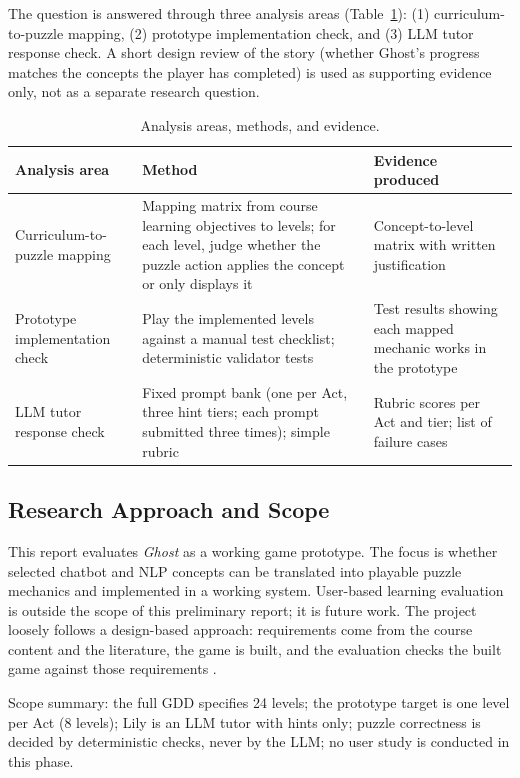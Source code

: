 \documentclass[11pt,a4paper]{article}
\begin{document}
The question is answered through three analysis areas (Table~\ref{tab:evals}): (1) curriculum-to-puzzle mapping, (2) prototype implementation check, and (3) LLM tutor response check. A short design review of the story (whether Ghost's progress matches the concepts the player has completed) is used as supporting evidence only, not as a separate research question.

\begin{table}[h]
\centering
\small
\begin{tabular}{p{4.2cm}p{5.5cm}p{4.3cm}}
\toprule
\textbf{Analysis area} & \textbf{Method} & \textbf{Evidence produced} \\
\midrule
Curriculum-to-puzzle mapping
  & Mapping matrix from course learning objectives to levels; for each level, judge whether the puzzle action applies the concept or only displays it
  & Concept-to-level matrix with written justification \\
\addlinespace
Prototype implementation check
  & Play the implemented levels against a manual test checklist; deterministic validator tests
  & Test results showing each mapped mechanic works in the prototype \\
\addlinespace
LLM tutor response check
  & Fixed prompt bank (one per Act, three hint tiers; each prompt submitted three times); simple rubric
  & Rubric scores per Act and tier; list of failure cases \\
\bottomrule
\end{tabular}
\caption{Analysis areas, methods, and evidence.}
\label{tab:evals}
\end{table}

\subsection{Research Approach and Scope}

This report evaluates \textit{Ghost} as a working game prototype. The focus is whether selected chatbot and NLP concepts can be translated into playable puzzle mechanics and implemented in a working system. User-based learning evaluation is outside the scope of this preliminary report; it is future work. The project loosely follows a design-based approach: requirements come from the course content and the literature, the game is built, and the evaluation checks the built game against those requirements \cite{brown1992}.

Scope summary: the full GDD specifies 24 levels; the prototype target is one level per Act (8 levels); Lily is an LLM tutor with hints only; puzzle correctness is decided by deterministic checks, never by the LLM; no user study is conducted in this phase.
\end{document}
